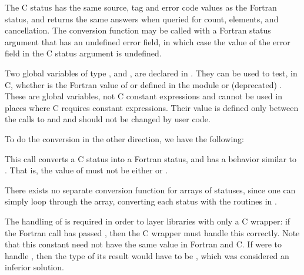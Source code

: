 The C status has the same source, tag and error code values as the
Fortran status, and returns the same answers when queried for count,
elements, and cancellation.
The conversion function may be called with a Fortran status argument that
has
an undefined error field, in which case the value of the error field
in the C status argument is undefined.

Two global variables of type ,
 and ,
are declared in .  They can be used to test, in C, whether
 is the Fortran value of 
or 
defined in the  module or (deprecated) .
These are global
variables, not C constant expressions and cannot be used in places
where C requires constant expressions. Their value is defined only
between the calls to  and 
and should not be changed by user code.

To do the conversion in the other direction, we have the following:

%

This call converts a C status into a Fortran status, and has a behavior
similar to .  That is, the value of
 must not be either  or
.

\begin{users}
There exists no separate
conversion function for arrays of statuses, since one
can simply loop through the array, converting each status
with the routines in .
\end{users}

\begin{rationale}
The handling of  is required in order to
layer libraries with only a C wrapper: if the Fortran call has passed
, then the C wrapper must handle this
correctly.
Note that this constant need not have the same value in
Fortran and C.  If  were to handle
, then the type of its result would have to be
, which was considered an inferior solution.
\end{rationale}

